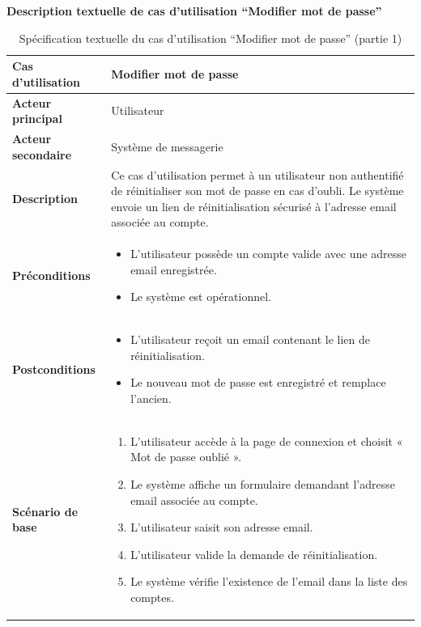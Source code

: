 \documentclass[a4paper,11pt]{report}
\begin{document}
\newpage
\textbf{Description textuelle de cas d’utilisation “Modifier mot de passe”}

\begin{table}[H]
  \centering
  \renewcommand{\arraystretch}{1.5}
  \caption{Spécification textuelle du cas d'utilisation “Modifier mot de passe” (partie 1)}
  \begin{tabularx}{\textwidth}{|l|X|}
    \hline
    \textbf{Cas d'utilisation}    & Modifier mot de passe \\ \hline
    \textbf{Acteur principal}     & Utilisateur \\ \hline
    \textbf{Acteur secondaire}    & Système de messagerie \\ \hline
    \textbf{Description}          & Ce cas d'utilisation permet à un utilisateur non authentifié de réinitialiser son mot de passe en cas d'oubli. Le système envoie un lien de réinitialisation sécurisé à l'adresse email associée au compte. \\ \hline
    \textbf{Préconditions}        &
      \begin{itemize}[leftmargin=*]
        \item L’utilisateur possède un compte valide avec une adresse email enregistrée.
        \item Le système est opérationnel.
      \end{itemize} \\ \hline
    \textbf{Postconditions}       &
      \begin{itemize}[leftmargin=*]
        \item L’utilisateur reçoit un email contenant le lien de réinitialisation.
        \item Le nouveau mot de passe est enregistré et remplace l'ancien.
      \end{itemize} \\ \hline
    \textbf{Scénario de base}      &
      \begin{enumerate}[leftmargin=*]
        \item L’utilisateur accède à la page de connexion et choisit « Mot de passe oublié ».
        \item Le système affiche un formulaire demandant l’adresse email associée au compte.
        \item L’utilisateur saisit son adresse email.
        \item L’utilisateur valide la demande de réinitialisation.
        \item Le système vérifie l’existence de l’email dans la liste des comptes.

\end{enumerate}
\end{tabularx}
\end{table}
\end{document}
